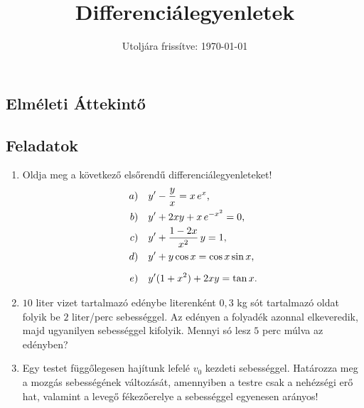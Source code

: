\documentclass[a4paper, 12pt, fleqn]{scrartcl}
\title{Differenciálegyenletek}
\date{Utoljára frissítve: \today}
\begin{document}
\maketitle

\subsection{Elméleti Áttekintő}

\clearpage
\subsection{Feladatok}

\begin{enumerate}
  \item Oldja meg a következő elsőrendű differenciálegyenleteket!
        \begin{align*}
          a) \quad y' & - \frac{y}{x} = x \, e^x
          \text,                                      \\
          b) \quad y' & + 2xy + x \, e^{-x^2} = 0
          \text,                                      \\
          c) \quad y' & + \frac{1 - 2x}{x^2} \, y = 1
          \text,                                      \\
          d) \quad y' & + y \cos x = \cos x \sin x
          \text,                                      \\[2mm]
          e) \quad y' & (1 + x^2) + 2xy = \tan x
          \text.
        \end{align*}

  \item $10$ liter vizet tartalmazó edénybe literenként $0,3$ kg sót tartalmazó
        oldat folyik be $2$ liter/perc sebességgel. Az edényen a folyadék
        azonnal elkeveredik, majd ugyanilyen sebességgel kifolyik. Mennyi só
        lesz $5$ perc múlva az edényben?

  \item Egy testet függőlegesen hajítunk lefelé $v_0$ kezdeti sebességgel.
        Határozza meg a mozgás sebességének változását, amennyiben a testre csak
        a nehézségi erő hat, valamint a levegő fékezőerelye a sebességgel
        egyenesen arányos!


\end{enumerate}
\end{document}
